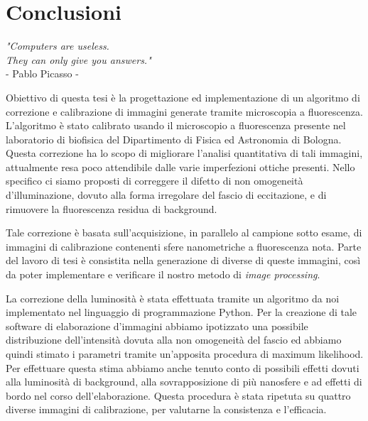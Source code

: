 \clearpage{\pagestyle{empty}\cleardoublepage}

\chapter*{Conclusioni}

\begin{flushright}
\begin{small}\textit{"Computers are useless.\\
 They can only give you answers."}\\
- Pablo Picasso -\\
\end{small}\end{flushright}


Obiettivo di questa tesi è la progettazione ed implementazione di un algoritmo di correzione e calibrazione di immagini generate tramite microscopia a fluorescenza.
L'algoritmo è stato calibrato usando il microscopio a fluorescenza presente nel laboratorio di biofisica del Dipartimento di Fisica ed Astronomia di Bologna.
Questa correzione ha lo scopo di migliorare l'analisi quantitativa di tali immagini, attualmente resa poco attendibile dalle varie imperfezioni ottiche presenti.
Nello specifico ci siamo proposti di correggere il difetto di non omogeneità d'illuminazione, dovuto alla forma irregolare del fascio di eccitazione, e di rimuovere la fluorescenza residua di background.

Tale correzione è basata sull'acquisizione, in parallelo al campione sotto esame, di immagini di calibrazione contenenti sfere nanometriche a fluorescenza nota.
Parte del lavoro di tesi è consistita nella generazione di diverse di queste immagini, così da poter implementare e verificare il nostro metodo di \textit{image processing}.

La correzione della luminosità è stata effettuata tramite un algoritmo da noi implementato nel linguaggio di programmazione Python.
Per la creazione di tale software di elaborazione d'immagini abbiamo ipotizzato una possibile distribuzione dell'intensità dovuta alla non omogeneità del fascio ed abbiamo quindi stimato i parametri tramite un'apposita procedura di maximum likelihood.
Per effettuare questa stima abbiamo anche tenuto conto di possibili effetti dovuti alla luminosità di background, alla sovrapposizione di più nanosfere e ad effetti di bordo nel corso dell'elaborazione.
Questa procedura è stata ripetuta su quattro diverse immagini di calibrazione, per valutarne la consistenza e l'efficacia.

